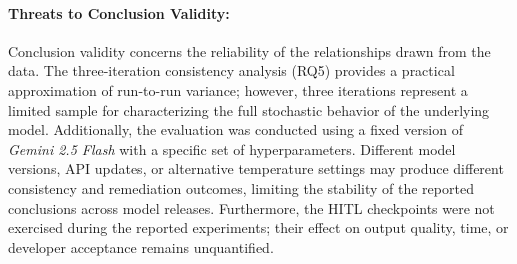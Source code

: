 \paragraph{Threats to Conclusion Validity:}
Conclusion validity concerns the reliability of the relationships drawn from the data. The three-iteration consistency analysis (RQ5) provides a practical approximation of run-to-run variance; however, three iterations represent a limited sample for characterizing the full stochastic behavior of the underlying model. Additionally, the evaluation was conducted using a fixed version of \textit{Gemini 2.5 Flash} with a specific set of hyperparameters. Different model versions, API updates, or alternative temperature settings may produce different consistency and remediation outcomes, limiting the stability of the reported conclusions across model releases. Furthermore, the HITL checkpoints were not exercised during the reported experiments; their effect on output quality, time, or developer acceptance remains unquantified.
